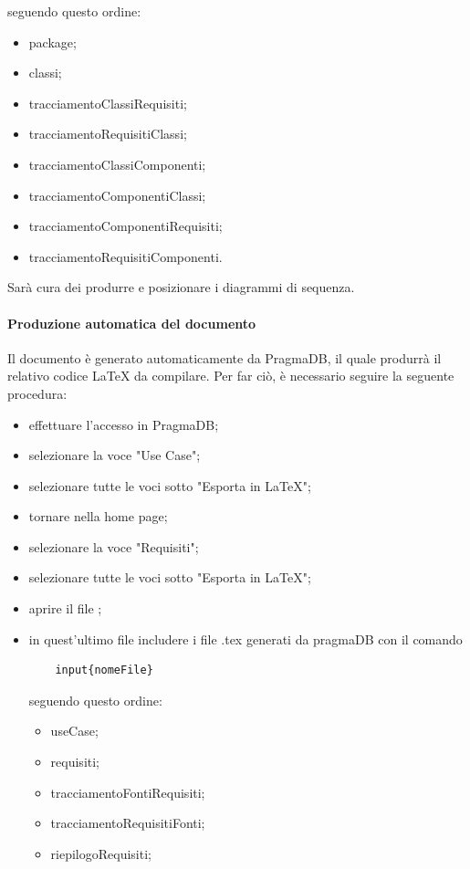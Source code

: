 \begin{itemize}
 	seguendo questo ordine:
 	\begin{itemize}
 		\item package;
 		\item classi;
 		\item tracciamentoClassiRequisiti;
 		\item tracciamentoRequisitiClassi;
 		\item tracciamentoClassiComponenti;
 		\item tracciamentoComponentiClassi;
 		\item tracciamentoComponentiRequisiti;
 		\item tracciamentoRequisitiComponenti.
 	\end{itemize}
 \end{itemize}
 Sarà cura dei \PJP{} produrre e posizionare i diagrammi di sequenza.
\paragraph{Produzione automatica del documento \ARdoc}
Il documento \ARdoc{} è generato automaticamente da PragmaDB, il quale produrrà il relativo codice \LaTeX{} da compilare.
Per far ciò, è necessario seguire la seguente procedura:
\begin{itemize}
	\item effettuare l'accesso in PragmaDB;
	\item selezionare la voce "Use Case";
	\item selezionare tutte le voci sotto "Esporta in \LaTeX";
	\item tornare nella home page;
	\item selezionare la voce "Requisiti";
	\item selezionare tutte le voci sotto "Esporta in \LaTeX";
	\item aprire il file \ARfile;
	\item in quest'ultimo file includere i file .tex generati da pragmaDB con il comando \begin{lstlisting}
	input{nomeFile}
	\end{lstlisting}
	seguendo questo ordine:
	\begin{itemize}
		\item useCase;
		\item requisiti;
		\item tracciamentoFontiRequisiti;
		\item tracciamentoRequisitiFonti;
		\item riepilogoRequisiti;
	\end{itemize}
\end{itemize}

